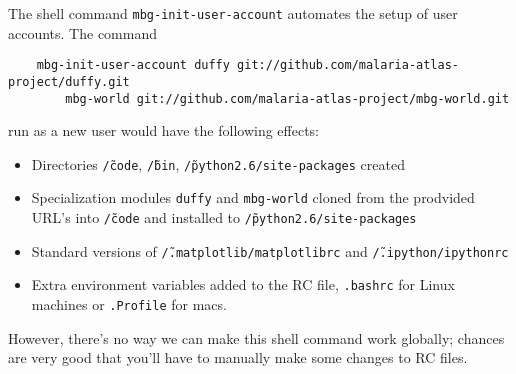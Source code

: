 The shell command \texttt{mbg-init-user-account} automates the setup of user accounts. The command
\begin{verbatim}
    mbg-init-user-account duffy git://github.com/malaria-atlas-project/duffy.git
        mbg-world git://github.com/malaria-atlas-project/mbg-world.git
\end{verbatim}
run as a new user would have the following effects:
\begin{itemize}
    \item Directories \texttt{\~/code}, \texttt{\~/bin}, \texttt{\~/python2.6/site-packages} created
    \item Specialization modules \texttt{duffy} and \texttt{mbg-world} cloned from the prodvided URL's into \texttt{\~/code} and installed to \texttt{\~/python2.6/site-packages}
    \item Standard versions of \texttt{\~/.matplotlib/matplotlibrc} and \texttt{\~/.ipython/ipythonrc}
    \item Extra environment variables added to the RC file, \texttt{.bashrc} for Linux machines or \texttt{.Profile} for macs.
\end{itemize}
However, there's no way we can make this shell command work globally; chances are very good that you'll have to manually make some changes to RC files.